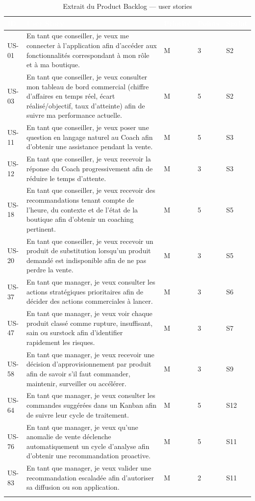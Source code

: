 \begin{longtable}{|P{1.3cm}|P{8cm}|P{1.6cm}|P{1.2cm}|P{1.2cm}|}
\hline
{}
\textcolor{white}{\textbf{ID}} &
\textcolor{white}{\textbf{User Story}} &
\textcolor{white}{\textbf{Priorité}} &
\textcolor{white}{\textbf{Points}} &
\textcolor{white}{\textbf{Sprint}} \\
\hline
\endhead
\hline
\endfoot
\hline
\endlastfoot
US-01 & En tant que conseiller, je veux me connecter à l'application afin d'accéder aux fonctionnalités correspondant à mon rôle et à ma boutique. & M & 3 & S2 \\
\hline
US-03 & En tant que conseiller, je veux consulter mon tableau de bord commercial (chiffre d'affaires en temps réel, écart réalisé/objectif, taux d'atteinte) afin de suivre ma performance actuelle. & M & 5 & S2 \\
\hline
US-11 & En tant que conseiller, je veux poser une question en langage naturel au Coach afin d'obtenir une assistance pendant la vente. & M & 5 & S3 \\
\hline
US-12 & En tant que conseiller, je veux recevoir la réponse du Coach progressivement afin de réduire le temps d'attente. & M & 3 & S3 \\
\hline
US-18 & En tant que conseiller, je veux recevoir des recommandations tenant compte de l'heure, du contexte et de l'état de la boutique afin d'obtenir un coaching pertinent. & M & 5 & S5 \\
\hline
US-20 & En tant que conseiller, je veux recevoir un produit de substitution lorsqu'un produit demandé est indisponible afin de ne pas perdre la vente. & M & 3 & S5 \\
\hline
US-37 & En tant que manager, je veux consulter les actions stratégiques prioritaires afin de décider des actions commerciales à lancer. & M & 3 & S6 \\
\hline
US-47 & En tant que manager, je veux voir chaque produit classé comme rupture, insuffisant, sain ou surstock afin d'identifier rapidement les risques. & M & 3 & S7 \\
\hline
US-58 & En tant que manager, je veux recevoir une décision d'approvisionnement par produit afin de savoir s'il faut commander, maintenir, surveiller ou accélérer. & M & 3 & S9 \\
\hline
US-64 & En tant que manager, je veux consulter les commandes suggérées dans un Kanban afin de suivre leur cycle de traitement. & M & 5 & S12 \\
\hline
US-76 & En tant que manager, je veux qu'une anomalie de vente déclenche automatiquement un cycle d'analyse afin d'obtenir une recommandation proactive. & M & 5 & S11 \\
\hline
US-83 & En tant que manager, je veux valider une recommandation escaladée afin d'autoriser sa diffusion ou son application. & M & 2 & S11 \\
\hline
\caption{Extrait du Product Backlog — user stories}
\label{tab:backlog-us-chap2}
\end{longtable}


